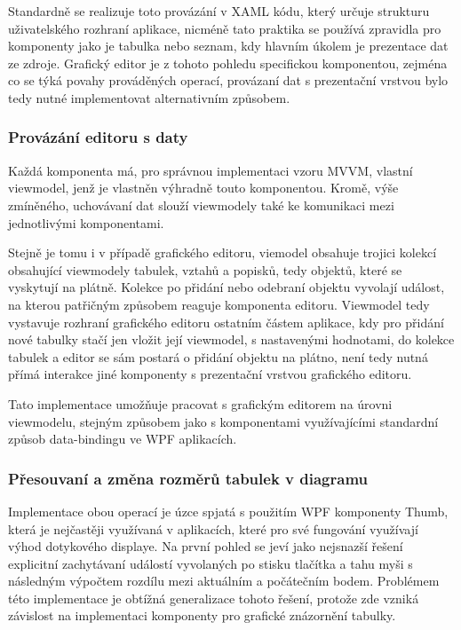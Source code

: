 \documentclass[czech,bachelor,public,dept460,male,oneside]{diploma}
\begin{document}
	Standardně se realizuje toto provázání v XAML kódu, který určuje strukturu uživatelského rozhraní aplikace, nicméně tato praktika se používá zpravidla pro komponenty jako je tabulka nebo seznam, kdy hlavním úkolem je prezentace dat ze zdroje. Grafický editor je z tohoto pohledu specifickou komponentou, zejména co se týká povahy prováděných operací, provázaní dat s prezentační vrstvou bylo tedy nutné implementovat alternativním způsobem. 
		
		\subsubsection{Provázání editoru s daty}
		Každá komponenta má, pro správnou implementaci vzoru MVVM, vlastní viewmodel, jenž je vlastněn výhradně touto komponentou. Kromě, výše zmíněného, uchovávaní dat slouží viewmodely také ke komunikaci mezi jednotlivými komponentami. 
		
		Stejně je tomu i v případě grafického editoru, viemodel obsahuje trojici kolekcí obsahující viewmodely tabulek, vztahů a popisků, tedy objektů, které se vyskytují na plátně. Kolekce po přidání nebo odebraní objektu vyvolají událost, na kterou patřičným způsobem reaguje komponenta editoru. Viewmodel tedy vystavuje rozhraní grafického editoru ostatním částem aplikace, kdy pro přidání nové tabulky stačí jen vložit její viewmodel, s nastavenými hodnotami, do kolekce tabulek a editor se sám postará o přidání objektu na plátno, není tedy nutná přímá interakce jiné komponenty s prezentační vrstvou grafického editoru.
		
		Tato implementace umožňuje pracovat s grafickým editorem na úrovni viewmodelu, stejným způsobem jako s komponentami využívajícími standardní způsob data-bindingu ve WPF aplikacích. 
		
		\subsubsection{Přesouvaní a změna rozměrů tabulek v diagramu}
		Implementace obou operací je úzce spjatá s použitím WPF komponenty Thumb, která je nejčastěji využívaná v aplikacích, které pro své fungování využívají výhod dotykového displaye. Na první pohled se jeví jako nejsnazší řešení explicitní zachytávaní událostí vyvolaných po stisku tlačítka a tahu myši s následným výpočtem rozdílu mezi aktuálním a počátečním bodem. Problémem této implementace je obtížná generalizace tohoto řešení, protože zde vzniká závislost na implementaci komponenty pro grafické znázornění tabulky. 
		
\end{document}
